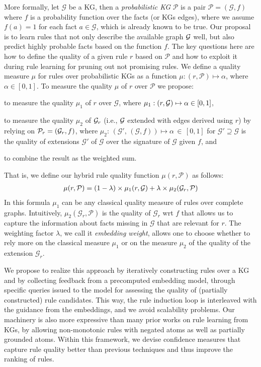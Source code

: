 \documentclass{llncs}
\newcommand{\G}{\ensuremath{\mathcal{G}}\xspace}
\newcommand{\PG}{\ensuremath{\mathcal{P}}\xspace}
\begin{document}
More formally, 
let $\G$ be a KG, then a \emph{probabilistic KG} $\PG$ is a pair $\PG = (\G,f)$ 
where $f$ is a probability function over the facts (or KGs edges), where we assume $f(a) = 1$ for each fact $a \in \G$, which is already known to be true.
Our proposal is to learn rules that not only describe the available graph $\mathcal{G}$ well, but also predict highly probable facts based on the function $f$.
The key questions here are how to define the quality of a given rule $r$ based on $\PG$ and how to exploit it during rule learning for pruning out not promising rules. 
We define a quality measure $\mu$ for rules over probabilistic KGs 
as a function $\mu: (r,\PG) \mapsto \alpha$, where $\alpha \in  [0,1]$.
To measure the quality $\mu$ of $r$ over $\PG$ we propose: 
\begin{compactitem}
	\item 
to measure the quality $\mu_1$ of $r$ over $\G$, where $\mu_1: (r,\mathcal{G}) \mapsto \alpha \in  [0,1]$,
\item
to measure the quality $\mu_2$ of $\mathcal{G}_r$ (i.e., $\mathcal{G}$ extended with edges derived using $r$) by relying on $\PG_r=(\cG_r,f)$, where $\mu_2{:}\, (\G'{,}\, (\G,f)) \mapsto  \alpha \,{\in}\, [0,1]$ for $\G' \supseteq \G$ is the quality of extensions $\G'$ of $\G$ over the signature of $\G$ given $f$,
and 
\item
to combine the result as the weighted sum.
\end{compactitem}
That is, we define our hybrid rule quality function $\mu(r,\PG)$ as follows:
\begin{align}\label{eq:hm}
	\mu(r,\PG)= (1 - \lambda)\times \mu_1(r,\cG) + \lambda \times \mu_2(\G_r,\PG)
\end{align}
In this formula $\mu_1$ can be any classical quality measure of rules over complete graphs. %
Intuitively, $\mu_2(\G_r,\PG)$ is the quality of $\G_r$ wrt $f$ that allows us to capture the information about facts missing in $\G$ that are relevant for $r$.
The weighting factor %
$\lambda$, we call it \textit{embedding weight}, allows one to choose whether %
to rely more on the classical measure $\mu_1$ or on the measure $\mu_2$ of 
the quality of the extension $\G_r$. %

We propose to realize this approach by iteratively constructing rules over a KG 
and by collecting feedback from a precomputed embedding model, 
through specific queries issued to the model 
for assessing the quality of (partially constructed) rule candidates. 
This way, the rule induction loop is interleaved with the guidance from the embeddings,
and we avoid scalability problems.
Our machinery is also more expressive than many prior works on rule learning from KGs,
by allowing non-monotonic rules with negated atoms as well as partially grounded atoms. 
Within this framework, we devise confidence measures that capture rule quality
better than previous techniques and thus improve the ranking of rules.
\end{document}
